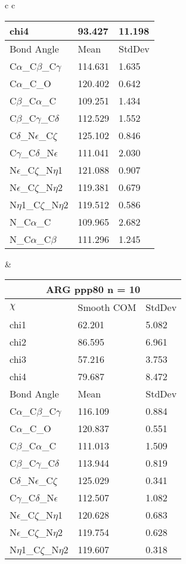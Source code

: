 \begin{longtable}{ c c }
\begin{tabular}{ l l l }
  chi4 & 93.427 & 11.198 \\ \midrule
  Bond Angle   & Mean     & StdDev \\ \midrule
  C$\alpha$\_C$\beta$\_C$\gamma$ & 114.631 & 1.635\\
  C$\alpha$\_C\_O & 120.402 & 0.642\\
  C$\beta$\_C$\alpha$\_C & 109.251 & 1.434\\
  C$\beta$\_C$\gamma$\_C$\delta$ & 112.529 & 1.552\\
  C$\delta$\_N$\epsilon$\_C$\zeta$ & 125.102 & 0.846\\
  C$\gamma$\_C$\delta$\_N$\epsilon$ & 111.041 & 2.030\\
  N$\epsilon$\_C$\zeta$\_N$\eta$1 & 121.088 & 0.907\\
  N$\epsilon$\_C$\zeta$\_N$\eta$2 & 119.381 & 0.679\\
  N$\eta$1\_C$\zeta$\_N$\eta$2 & 119.512 & 0.586\\
  N\_C$\alpha$\_C & 109.965 & 2.682\\
  N\_C$\alpha$\_C$\beta$ & 111.296 & 1.245\\
  \bottomrule
  \end{tabular}
  &
  \begin{tabular}{ l l l }
  \toprule
  \multicolumn{3}{c}{ARG \textbf{ppp80} n = 10} \\ \toprule
  $\chi$       & Smooth COM & StdDev \\ \midrule
  chi1 & 62.201 & 5.082 \\ 
  chi2 & 86.595 & 6.961 \\ 
  chi3 & 57.216 & 3.753 \\ 
  chi4 & 79.687 & 8.472 \\ \midrule
  Bond Angle   & Mean     & StdDev \\ \midrule
  C$\alpha$\_C$\beta$\_C$\gamma$ & 116.109 & 0.884\\
  C$\alpha$\_C\_O & 120.837 & 0.551\\
  C$\beta$\_C$\alpha$\_C & 111.013 & 1.509\\
  C$\beta$\_C$\gamma$\_C$\delta$ & 113.944 & 0.819\\
  C$\delta$\_N$\epsilon$\_C$\zeta$ & 125.029 & 0.341\\
  C$\gamma$\_C$\delta$\_N$\epsilon$ & 112.507 & 1.082\\
  N$\epsilon$\_C$\zeta$\_N$\eta$1 & 120.628 & 0.683\\
  N$\epsilon$\_C$\zeta$\_N$\eta$2 & 119.754 & 0.628\\
  N$\eta$1\_C$\zeta$\_N$\eta$2 & 119.607 & 0.318\\

\end{tabular}
\end{longtable}

